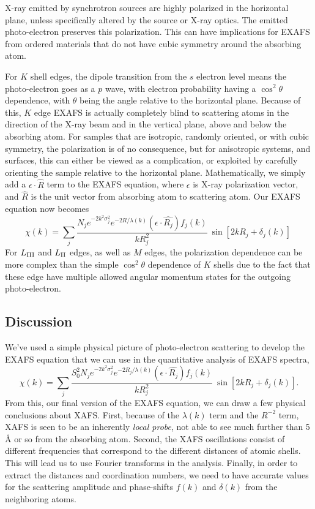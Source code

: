 X-ray emitted by synchrotron sources are highly polarized in the horizontal
plane, unless specifically altered by the source or X-ray optics.   The
emitted photo-electron preserves this polarization.  This can have
implications for EXAFS from ordered materials that do not have cubic
symmetry around the absorbing atom.

For $K$ shell edges, the dipole transition from the $s$ electron level means
the photo-electron goes as a $p$ wave, with electron probability having a
$\cos^2\theta$ dependence, with $\theta$ being the angle relative to the
horizontal plane.   Because of this, $K$ edge EXAFS is actually completely
blind to scattering atoms in the direction of the X-ray beam and  in the
vertical plane, above and below the absorbing atom.   For samples that are
isotropic, randomly oriented, or with cubic symmetry, the polarization is
of no consequence, but for anisotropic systems, and surfaces, this can
either be viewed as a complication, or exploited by carefully orienting the
sample relative to the horizontal plane.  Mathematically, we simply add
a $\epsilon \cdot \hat{R}$ term to the EXAFS equation,
where $\epsilon$ is X-ray polarization vector, and $\hat{R}$ is the unit vector from
absorbing atom to scattering atom.  Our EXAFS equation  now becomes
\begin{equation}
  \chi(k) = \sum_j {
    {{ \frac{N_j e^{-2k^2\sigma_j^2}
          e^{-2R/\lambda(k)} (\epsilon \cdot \hat{R_j}) f_j(k) }{kR_j^2}}}\>
    \sin[2kR_j + \delta_j(k)] } \>
      \label{Eq:xafs_withpolar}
\end{equation}
\noindent
For  $L_{\rm{III}}$ and $L_{\rm{ II}}$ edges, as well as $M$ edges, the
polarization dependence can be more complex than the simple $\cos^2\theta$
dependence of $K$ shells due to the fact that these edge have multiple
allowed angular momentum states for the outgoing photo-electron.

\subsection{Discussion}


We've used a simple physical picture of photo-electron scattering to
develop the EXAFS equation that we can use in the quantitative analysis of
EXAFS spectra,
\begin{equation}
  \chi(k) = \sum_j {
    {{\frac{S_0^2 N_j e^{-2k^2\sigma_j^2} e^{-2R_j/\lambda(k)}
 (\epsilon \cdot \hat{R_j}) f_j(k)}{kR_j^2}}}\>
    \sin[2kR_j + \delta_j(k)] }.
  \label{Eq:xafs_final}
\end{equation}
\noindent
From this, our final version of the EXAFS equation, we can draw a
few physical conclusions about XAFS.  First, because of the $\lambda(k)$
term and the $R^{-2}$ term, XAFS is seen to be an inherently \emph{local
  probe}, not able to see much further than 5 {\AA} or so from the
absorbing atom.   Second, the XAFS oscillations consist of different
frequencies that correspond to the different distances of atomic shells.
This will lead us to use Fourier transforms in the analysis.  Finally, in
order to extract the distances and coordination numbers, we need to have
accurate values for the scattering amplitude and phase-shifts $f(k)$ and
$\delta(k)$ from the neighboring atoms.

